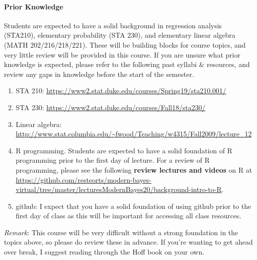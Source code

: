 \documentclass[11pt]{article}
\begin{document}

\paragraph{Prior Knowledge}
Students are expected to have a solid background in regression analysis (STA210), elementary probability (STA 230), and elementary linear algebra (MATH 202/216/218/221). These will be building blocks for course topics, and very little review will be provided in this course.  If you are unsure what prior knowledge is expected, please refer to the following past syllabi \& resources, and review any gaps in knowledge before the start of the semester. 
\begin{enumerate}
\item STA 210: \url{https://www2.stat.duke.edu/courses/Spring19/sta210.001/}
\item STA 230: \url{https://www2.stat.duke.edu/courses/Fall18/sta230/}
\item Linear algebra: \url{http://www.stat.columbia.edu/~fwood/Teaching/w4315/Fall2009/lecture_12}
\item R programming. Students are expected to have a solid foundation of R programming prior to the first day of lecture. For a review of R programming, please see the following \textbf{review lectures and videos} on R at \url{https://github.com/resteorts/modern-bayes-virtual/tree/master/lecturesModernBayes20/background-intro-to-R}.
\item github: I expect that you have a solid foundation of using github prior to the first day of class as this will be important for accessing all class resources.  
\end{enumerate}
\emph{Remark}: This course will be very difficult without a strong foundation in the topics above, so please do review these in advance. If you're wanting to get ahead over break, I suggest reading through the Hoff book on your own. \\
\end{document}
